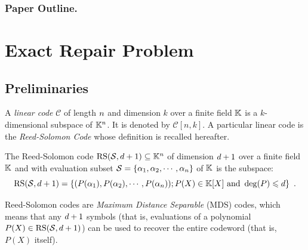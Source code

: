 \documentclass{llncs}
\begin{document}
\subsubsection{Paper Outline.}


\section{Exact Repair Problem}
\subsection{Preliminaries}

A {\em linear code} $\mathcal{C}$ of length $\nbShares$ and dimension $k$ over a finite field $\Field$ is a $k$-dimensional subspace of $\Field^{\nbShares}$. It is denoted by $\mathcal{C}[n,k]$. A particular linear code is the {\em Reed-Solomon Code} whose definition is recalled hereafter.

\begin{definition}
The Reed-Solomon code $\RS[\pubSet, \order + 1]\subseteq \Field^{\nbShares}$ of dimension $\order + 1$ over a finite field $\Field$ and with evaluation subset $\pubSet = \{\pubElt[1],\pubElt[2],\cdots,\pubElt[\nbShares]\}$ of $\Field$ is the subspace:
$$\RS[\pubSet,\order + 1] = \{(P(\pubElt[1]),P(\pubElt[2]),\cdots,P(\pubElt[\nbShares])); P(X) \in \Field[X] \text{ and } \deg(P) \leqslant \order\} \enspace .$$
\end{definition}

Reed-Solomon codes are {\em Maximum Distance Separable} (MDS) codes, which means that any $\order + 1$ symbols (that is, evaluations of a polynomial $P(X)\in \RS[\pubSet,\order+1]$) can be used to recover the entire codeword (that is,
$P(X)$ itself).
\vspace{3mm}
\end{document}
